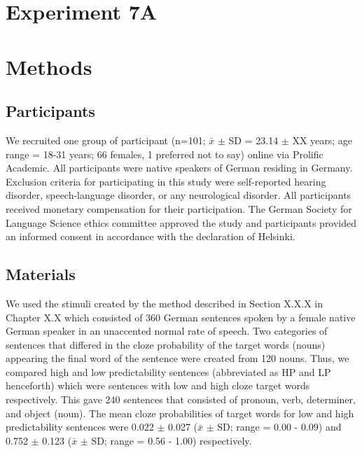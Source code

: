 \documentclass[a4paper, nobind]{templates/ociamthesis}
\begin{document}
\hypertarget{experiment-7a}{%
\section{Experiment 7A}\label{experiment-7a}}

\hypertarget{methods-3}{%
\section{Methods}\label{methods-3}}

\hypertarget{participants-2}{%
\subsection{Participants}\label{participants-2}}

We recruited one group of participant (n=101; \(\bar{x}\) \(\pm\) SD = 23.14 \(\pm\) XX years; age range = 18-31 years; 66 females, 1 preferred not to say) online via Prolific Academic.
All participants were native speakers of German residing in Germany.
Exclusion criteria for participating in this study were self-reported hearing disorder, speech-language disorder, or any neurological disorder.
All participants received monetary compensation for their participation.
The German Society for Language Science ethics committee approved the study and participants provided an informed consent in accordance with the declaration of Helsinki.

\hypertarget{materials-2}{%
\subsection{Materials}\label{materials-2}}

We used the stimuli created by the method described in Section X.X.X in Chapter X.X which consisted of 360 German sentences spoken by a female native German speaker in an unaccented normal rate of speech.
Two categories of sentences that differed in the cloze probability of the target words (nouns) appearing the final word of the sentence were created from 120 nouns.
Thus, we compared high and low predictability sentences (abbreviated as HP and LP henceforth) which were sentences with low and high cloze target words respectively.
This gave 240 sentences that consisted of pronoun, verb, determiner, and object (noun).
The mean cloze probabilities of target words for low and high predictability sentences were 0.022 \(\pm\) 0.027 (\(\bar{x}\) \(\pm\) SD; range = 0.00 - 0.09) and 0.752 \(\pm\) 0.123 (\(\bar{x}\) \(\pm\) SD; range = 0.56 - 1.00) respectively.
\end{document}
